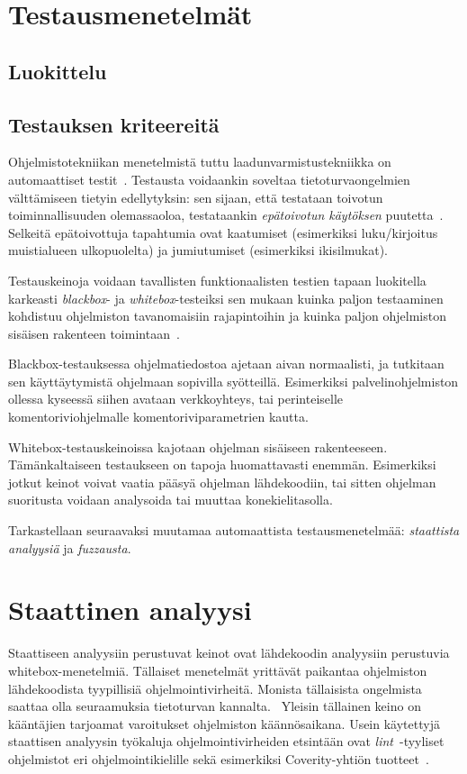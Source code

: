 \section{Testausmenetelmät}

\subsection{Luokittelu}
\subsection{Testauksen kriteereitä}

Ohjelmistotekniikan menetelmistä tuttu laadunvarmistustekniikka on automaattiset testit~\cite{Sommerville}.
Testausta voidaankin soveltaa tietoturvaongelmien välttämiseen tietyin edellytyksin:
sen sijaan, että testataan toivotun toiminnallisuuden olemassaoloa,
testataankin \emph{epätoivotun käytöksen} puutetta~\cite{OuluBrowser}.
Selkeitä epätoivottuja tapahtumia ovat kaatumiset (esimerkiksi luku/kirjoitus muistialueen ulkopuolelta) ja jumiutumiset (esimerkiksi ikisilmukat).

Testauskeinoja voidaan tavallisten funktionaalisten testien tapaan luokitella karkeasti \emph{blackbox}- ja \emph{whitebox}-testeiksi sen mukaan kuinka paljon
testaaminen kohdistuu ohjelmiston tavanomaisiin rajapintoihin ja kuinka paljon ohjelmiston sisäisen rakenteen toimintaan~\cite{Sommerville}.

Blackbox-testauksessa ohjelmatiedostoa ajetaan aivan normaalisti,
ja tutkitaan sen käyttäytymistä ohjelmaan sopivilla syötteillä.
Esimerkiksi palvelinohjelmiston ollessa kyseessä siihen avataan verkkoyhteys,
tai perinteiselle komentoriviohjelmalle komentoriviparametrien kautta.

Whitebox-testauskeinoissa kajotaan ohjelman sisäiseen rakenteeseen.
Tämänkaltaiseen testaukseen on tapoja huomattavasti enemmän.
Esimerkiksi jotkut keinot voivat vaatia pääsyä ohjelman lähdekoodiin,
tai sitten ohjelman suoritusta voidaan analysoida tai muuttaa konekielitasolla.

Tarkastellaan seuraavaksi muutamaa automaattista testausmenetelmää: \emph{staattista analyysiä} ja \emph{fuzzausta}.

\section{Staattinen analyysi}

Staattiseen analyysiin perustuvat keinot ovat lähdekoodin analyysiin perustuvia whitebox-menetelmiä.
Tällaiset menetelmät yrittävät paikantaa ohjelmiston lähdekoodista tyypillisiä ohjelmointivirheitä.
Monista tällaisista ongelmista saattaa olla seuraamuksia tietoturvan kannalta.~\cite{StaticCodeAnalysis}
Yleisin tällainen keino on kääntäjien tarjoamat varoitukset ohjelmiston käännösaikana.
Usein käytettyjä staattisen analyysin työkaluja ohjelmointivirheiden etsintään
ovat \emph{lint}~\cite{Lint}-tyyliset ohjelmistot eri ohjelmointikielille sekä
esimerkiksi Coverity-yhtiön tuotteet~\cite{Coverity}.

